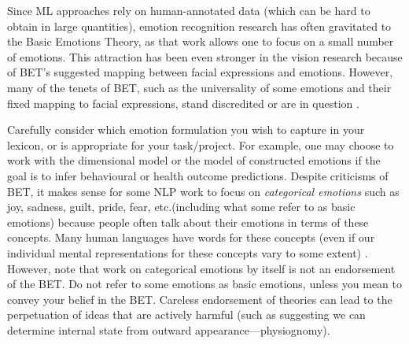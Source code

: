 \documentclass[11pt]{article}
\newcommand{\sm}[1]{{\color{black} #1}} %
\begin{document}
Since ML approaches rely on human-annotated data (which can be hard to obtain in large quantities), emotion recognition research has often gravitated to the Basic Emotions Theory, as that work allows one to focus on a small number of emotions. This attraction has been even stronger in the vision research because of BET's suggested mapping between facial expressions and emotions. However, many of the tenets of BET, such as the universality of some emotions and their fixed mapping to facial expressions, stand discredited or are in question \cite{barrett2017emotions,barrett2019emotional}.


Carefully consider which emotion formulation you wish to capture in your lexicon, or is appropriate for your task/project. For example, one may choose to work with the dimensional model or the model of constructed emotions if the goal is to infer behavioural or health outcome predictions. 
Despite criticisms of BET, it makes sense for some NLP work to focus on \textit{categorical emotions} such as joy, sadness, guilt, pride, fear, etc.\@ (including what some refer to as basic emotions) because people often talk about their emotions in terms of these concepts. Many human languages have words for these concepts (even if our individual mental representations for these concepts vary to some extent) \cite{wierzbicka1999emotions}. However, note that work on categorical emotions by itself is not an endorsement of the BET. Do not refer to some emotions as basic emotions, unless you mean to convey your belief in the BET. Careless endorsement of theories can lead to the perpetuation of ideas that are actively harmful (such as suggesting we can determine internal state from outward appearance---physiognomy).\\[-8pt]

\end{document}
